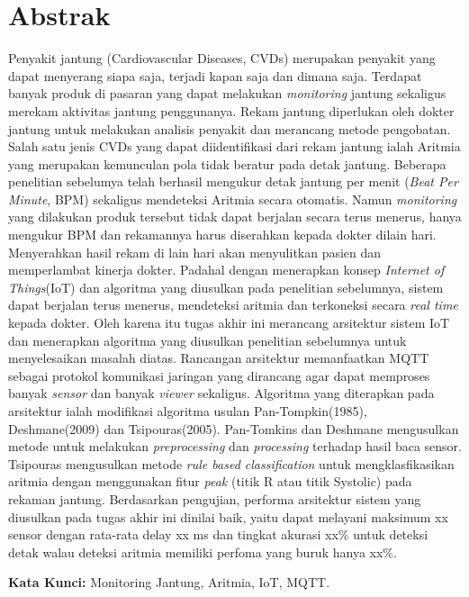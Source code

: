 \chapter*{Abstrak}
Penyakit jantung (Cardiovascular Diseases, CVDs) merupakan penyakit yang dapat menyerang siapa saja, terjadi kapan saja dan dimana saja. Terdapat banyak produk di pasaran yang dapat melakukan \textit{monitoring} jantung sekaligus merekam aktivitas jantung penggunanya. Rekam jantung diperlukan oleh dokter jantung untuk melakukan analisis penyakit dan merancang metode pengobatan. Salah satu jenis CVDs yang dapat diidentifikasi dari rekam jantung ialah Aritmia yang merupakan kemunculan pola tidak beratur pada detak jantung. Beberapa penelitian sebelumya telah berhasil mengukur detak jantung per menit (\textit{Beat Per Minute}, BPM) sekaligus mendeteksi Aritmia secara otomatis.
Namun \textit{monitoring} yang dilakukan produk tersebut tidak dapat berjalan secara terus menerus, hanya mengukur BPM dan rekamannya harus diserahkan kepada dokter dilain hari. Menyerahkan hasil rekam di lain hari akan menyulitkan pasien dan memperlambat kinerja dokter. Padahal dengan menerapkan konsep \textit{Internet of Things}(IoT) dan algoritma yang diusulkan pada penelitian sebelumnya, sistem dapat berjalan terus menerus, mendeteksi aritmia dan terkoneksi secara \textit{real time} kepada dokter.
Oleh karena itu tugas akhir ini merancang arsitektur sistem IoT dan menerapkan algoritma yang diusulkan penelitian sebelumnya untuk menyelesaikan masalah diatas.
Rancangan arsitektur memanfaatkan MQTT sebagai protokol komunikasi jaringan yang dirancang agar dapat memproses banyak \textit{sensor} dan banyak \textit{viewer} sekaligus. Algoritma yang diterapkan pada arsitektur ialah modifikasi algoritma usulan Pan-Tompkin(1985), Deshmane(2009) dan Tsipouras(2005).
Pan-Tomkins dan Deshmane mengusulkan metode untuk melakukan \textit{preprocessing} dan \textit{processing} terhadap hasil baca sensor. Tsipouras mengusulkan metode \textit{rule based classification} untuk mengklasfikasikan aritmia dengan menggunakan fitur \textit{peak} (titik R atau titik Systolic) pada rekaman jantung.
Berdasarkan pengujian, performa arsitektur sistem yang diusulkan pada tugas akhir ini dinilai baik, yaitu dapat melayani maksimum xx sensor dengan rata-rata delay xx ms dan tingkat akurasi xx\% untuk deteksi detak walau deteksi aritmia memiliki perfoma yang buruk hanya xx\%.
  
\vspace{0.5 cm}
\begin{flushleft}
{\textbf{Kata Kunci:} Monitoring Jantung, Aritmia, IoT, MQTT.}
\end{flushleft}